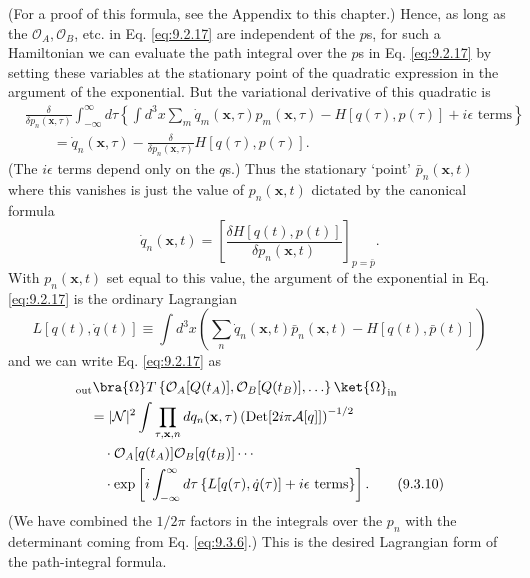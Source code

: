 (For a proof of this formula, see the Appendix to this chapter.) Hence, as
long as the $\mathcal O_A,\mathcal O_B$, etc. in Eq. \eqref{eq:9.2.17} are independent
of the $p$s, for such a Hamiltonian we can evaluate the path integral over the
$p$s in Eq. \eqref{eq:9.2.17} by setting these variables at the stationary point of the
quadratic expression in the argument of the exponential. But the variational
derivative of this quadratic is
\begin{align*}
&\frac{\delta}{\delta p_n(\mathbf{x},\tau)}
 \int_{-\infty}^{\infty}d\tau
 \left\{\int d^3x\sum_m\dot q_m(\mathbf{x},\tau)p_m(\mathbf{x},\tau)
 -H[q(\tau),p(\tau)]+i\epsilon\text{ terms}\right\}
\\
&\qquad=\dot q_n(\mathbf{x},\tau)
 -\frac{\delta}{\delta p_n(\mathbf{x},\tau)}H[q(\tau),p(\tau)].
\end{align*}
(The $i\epsilon$ terms depend only on the $q$s.) Thus the stationary `point'
$\bar p_n(\mathbf{x},t)$ where this vanishes is just the value of
$p_n(\mathbf{x},t)$ dictated by the canonical formula
\begin{equation}
\dot q_n(\mathbf{x},t)
=\left[\frac{\delta H[q(t),p(t)]}{\delta p_n(\mathbf{x},t)}\right]_{p=\bar p}.
\tag{9.3.8}\label{eq:9.3.8}
\end{equation}
With $p_n(\mathbf{x},t)$ set equal to this value, the argument of the
exponential in Eq. \eqref{eq:9.2.17} is the ordinary Lagrangian
\begin{equation}
L[q(t),\dot q(t)]\equiv\int d^3x\left(
 \sum_n\dot q_n(\mathbf{x},t)\bar p_n(\mathbf{x},t)
 -H[q(t),\bar p(t)]\right)
\tag{9.3.9}\label{eq:9.3.9}
\end{equation}
and we can write Eq. \eqref{eq:9.2.17} as
\begin{align}
&{}_{\mathrm{out}}\bra{\Omega}T\left\{
 \mathcal O_A[Q(t_A)],\mathcal O_B[Q(t_B)],\ldots\right\}
 \ket{\Omega}_{\mathrm{in}}
\notag\\
&\quad=|\mathcal N|^2\int\prod_{\tau,\mathbf{x},n}dq_n(\mathbf{x},\tau)
 \left(\operatorname{Det}[2i\pi\mathcal A[q]]\right)^{-1/2}
\notag\\
&\qquad\cdot\mathcal O_A[q(t_A)]\mathcal O_B[q(t_B)]\cdots
\notag\\
&\qquad\cdot\exp\left[i\int_{-\infty}^{\infty}d\tau
 \left\{L[q(\tau),\dot q(\tau)]+i\epsilon\text{ terms}\right\}\right].
\tag{9.3.10}\label{eq:9.3.10}
\end{align}
(We have combined the $1/2\pi$ factors in the integrals over the $p_n$ with
the determinant coming from Eq. \eqref{eq:9.3.6}.) This is the desired Lagrangian form
of the path-integral formula.

